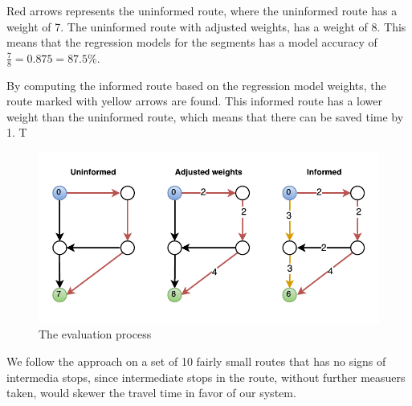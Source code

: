 Red arrows represents the uninformed route, where the uninformed route has a weight of 7. The uninformed route with adjusted weights, has a weight of 8. This means that the regression models for the segments has a model accuracy of $\frac{7}{8}=0.875=87.5\%$. 

By computing the informed route based on the regression model weights, the route marked with yellow arrows are found. This informed route has a lower weight than the uninformed route, which means that there can be saved time by 1. T

\begin{figure}
\centering
\includegraphics[width=\textwidth]{figures/eval.pdf}
\caption{The evaluation process}
\label{fig:eval}
\end{figure}

We follow the approach on a set of 10 fairly small routes that has no signs of intermedia stops, since intermediate stops in the route, without further measuers taken, would skewer the travel time in favor of our system.

